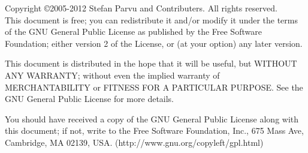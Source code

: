 \pagebreak
\begin{small}

\noindent
Copyright \copyright 2005-2012 Stefan Parvu and Contributers. All rights reserved.
\\

\noindent
This document is free; you can redistribute it and/or modify it
under the terms of the GNU General Public License as published by
the Free Software Foundation; either version 2 of the License, or
(at your option) any later version.

\noindent
\newline
This document is distributed in the hope that it will be useful, but
WITHOUT ANY WARRANTY; without even the implied warranty of
MERCHANTABILITY or FITNESS FOR A PARTICULAR PURPOSE\@.  See the GNU
General Public License for more details.

\noindent
\newline
You should have received a copy of the GNU General Public License
along with this document; if not, write to the Free Software
Foundation, Inc., 675 Mass Ave, Cambridge, MA 02139, USA.
(http://www.gnu.org/copyleft/gpl.html)

\end{small}

\endinput
